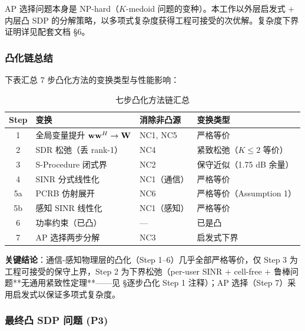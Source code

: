 \begin{remark}[AP 选择的工程取舍]\label{rem:ap_heuristic}
AP 选择问题本身是 NP-hard（$K$-medoid 问题的变种）。本工作以外层启发式 + 内层凸 SDP 的分解策略，以多项式复杂度获得工程可接受的次优解。复杂度下界证明详见配套文档 §6。
\end{remark}

\subsubsection{凸化链总结}

下表汇总 7 步凸化方法的变换类型与性能影响：

\begin{table}[htbp]
\centering
\caption{七步凸化方法链汇总}\label{tab:convex_chain}
\begin{tabular}{clll}
\toprule
Step & 变换 & 消除非凸源 & 变换类型 \\
\midrule
1 & 全局变量提升 $\mathbf{w}\mathbf{w}^H \to \mathbf{W}$ & NC1, NC5 & 严格等价 \\
2 & SDR 松弛（丢 rank-1） & NC4 & 紧致松弛（$K\leq 2$ 等价）\\
3 & S-Procedure 闭式界 & NC2 & 保守近似（1.75 dB 余量）\\
4 & SINR 分式线性化 & NC1（通信） & 严格等价 \\
5a & PCRB 仿射展开 & NC6 & 严格等价（Assumption 1）\\
5b & 感知 SINR 线性化 & NC1（感知） & 严格等价 \\
6 & 功率约束（已凸） & --- & 已是凸 \\
7 & AP 选择两步分解 & NC3 & 启发式下界 \\
\bottomrule
\end{tabular}
\end{table}

\textbf{关键结论}：通信-感知物理层的凸化（Step 1--6）几乎全部严格等价，仅 Step 3 为工程可接受的保守上界，Step 2 为下界松弛（per-user SINR + cell-free + 鲁棒问题**无通用紧致性定理**——见 §逐步凸化 Step 1 注释）；AP 选择（Step 7）采用启发式以保证多项式复杂度。

\subsubsection{最终凸 SDP 问题 (P3)}

